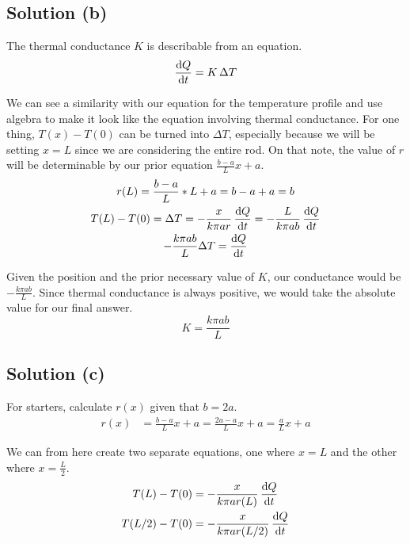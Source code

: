 \documentclass[12pt]{article}
\begin{document}
        \subsection{Solution (b)}
            The thermal conductance $K$ is describable from an equation.
            \begin{gather}
                \dv{Q}{t}   =   K\,\Delta T
            \end{gather}

            We can see a similarity with our equation for the temperature profile and use algebra to make it look like the equation involving thermal conductance.
            For one thing, $T(x) - T(0)$ can be turned into $\Delta T$, especially because we will be setting $x = L$ since we are considering the entire rod.
            On that note, the value of $r$ will be determinable by our prior equation $\frac{b - a}{L}x + a$. 
            \begin{gather}
                r(L)    =   \frac{b - a}{L} * L + a
                    =   b - a + a
                    =   b\\
                T(L) - T(0) =   \Delta T
                    =   -\frac{x}{k \pi ar}\,\dv{Q}{t}
                    =   -\frac{L}{k \pi ab}\,\dv{Q}{t}\\
                -\frac{k \pi ab}{L}\Delta T =   \dv{Q}{t}
            \end{gather}

            Given the position and the prior necessary value of $K$, our conductance would be $-\frac{k \pi ab}{L}$.
            Since thermal conductance is always positive, we would take the absolute value for our final answer.
            \begin{equation}
                \boxed{K = \frac{k \pi ab}{L}}
            \end{equation}
        
        \subsection{Solution (c)}
            For starters, calculate $r(x)$ given that $b = 2a$.
            \begin{align}
                r(x)    &=  \frac{b - a}{L}x + a
                    =   \frac{2a - a}{L}x + a
                    =   \frac{a}{L}x + a
            \end{align}

            We can from here create two separate equations, one where $x = L$ and the other where $x = \frac{L}{2}$.
            \begin{gather}
                T(L) - T(0) =   -\frac{x}{k \pi ar(L)}\,\dv{Q}{t}\\
                T(L/2) - T(0)   =   -\frac{x}{k \pi ar(L/2)}\,\dv{Q}{t}
            \end{gather}
\end{document}
